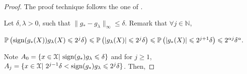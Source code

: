 \begin{proof}
The proof technique follows the one of \citet{audibert2007fast}. 

Let $\delta,\lambda > 0$, such that $\|g_* - g_\lambda\|_\infty \leqslant \delta$. Remark that $\forall j \in \mathbb{N}$, 

$\P \left({\textrm {sign} (g_*(X)) g_\lambda(X) \leqslant 2^{j} \delta } \right) \leqslant \P \left({ |g_\lambda(X)| \leqslant 2^{j} \delta } \right) \leqslant \P \left({ |g_*(X)| \leqslant 2^{j+1} \delta } \right) \leqslant 2^{\alpha j} \delta^{\alpha}.$

Note $A_0 = \{ x \in \X |\ {\textrm {sign} (g_*) g_\lambda \leqslant \delta }  \}$ and for $j \geqslant 1 $, $A_j = \{ x \in \X |\ 2^{j-1} \delta < {\textrm {sign} (g_*) g_\lambda \leqslant 2^{j} \delta }  \} $. Then,


\end{proof}
